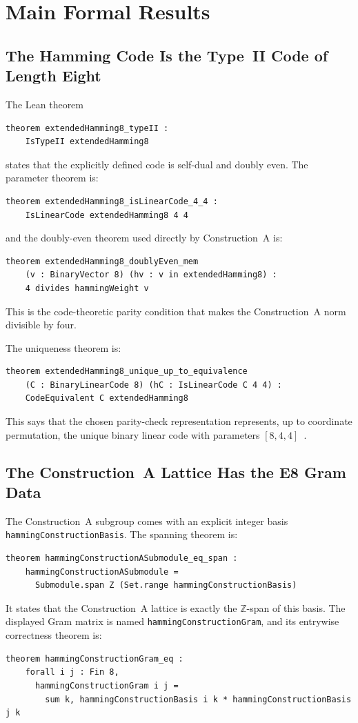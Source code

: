 \documentclass[12pt]{article}
\theoremstyle{definition}
\newcommand{\Z}{\mathbb{Z}}
\newcommand{\code}[1]{\texttt{#1}}
\begin{document}
\section{Main Formal Results}
\label{sec:results}

\subsection{The Hamming Code Is the Type~II Code of Length Eight}

The Lean theorem
\begin{lstlisting}[style=lean]
theorem extendedHamming8_typeII :
    IsTypeII extendedHamming8
\end{lstlisting}
states that the explicitly defined code is self-dual and doubly even.  The
parameter theorem is:
\begin{lstlisting}[style=lean]
theorem extendedHamming8_isLinearCode_4_4 :
    IsLinearCode extendedHamming8 4 4
\end{lstlisting}
and the doubly-even theorem used directly by Construction~A is:
\begin{lstlisting}[style=lean]
theorem extendedHamming8_doublyEven_mem
    (v : BinaryVector 8) (hv : v in extendedHamming8) :
    4 divides hammingWeight v
\end{lstlisting}
This is the code-theoretic parity condition that makes the Construction~A norm
divisible by four.

The uniqueness theorem is:
\begin{lstlisting}[style=lean]
theorem extendedHamming8_unique_up_to_equivalence
    (C : BinaryLinearCode 8) (hC : IsLinearCode C 4 4) :
    CodeEquivalent C extendedHamming8
\end{lstlisting}
This says that the chosen parity-check representation represents, up to
coordinate permutation, the unique binary linear code with parameters
$[8,4,4]$~\cite{MacSloane1977,ConwaySloane1999}.

\subsection{The Construction~A Lattice Has the E8 Gram Data}

The Construction~A subgroup comes with an explicit integer basis
\code{hammingConstructionBasis}.  The spanning theorem is:
\begin{lstlisting}[style=lean]
theorem hammingConstructionASubmodule_eq_span :
    hammingConstructionASubmodule =
      Submodule.span Z (Set.range hammingConstructionBasis)
\end{lstlisting}
It states that the Construction~A lattice is exactly the $\Z$-span of this
basis.  The displayed Gram matrix is named \code{hammingConstructionGram}, and
its entrywise correctness theorem is:
\begin{lstlisting}[style=lean]
theorem hammingConstructionGram_eq :
    forall i j : Fin 8,
      hammingConstructionGram i j =
        sum k, hammingConstructionBasis i k * hammingConstructionBasis j k
\end{lstlisting}
\end{document}
